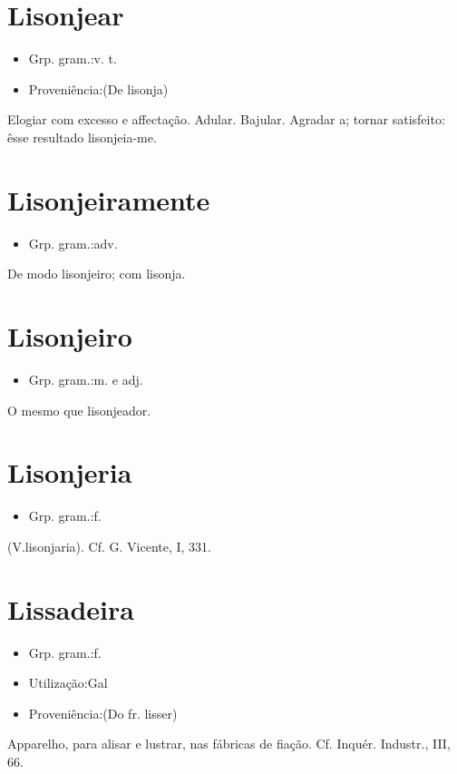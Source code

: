 \section{Lisonjear}
\begin{itemize}
\item {Grp. gram.:v. t.}
\end{itemize}
\begin{itemize}
\item {Proveniência:(De \textunderscore lisonja\textunderscore )}
\end{itemize}
Elogiar com excesso e affectação.
Adular.
Bajular.
Agradar a; tornar satisfeito: \textunderscore êsse resultado lisonjeia-me\textunderscore .
\section{Lisonjeiramente}
\begin{itemize}
\item {Grp. gram.:adv.}
\end{itemize}
De modo lisonjeiro; com lisonja.
\section{Lisonjeiro}
\begin{itemize}
\item {Grp. gram.:m.  e  adj.}
\end{itemize}
O mesmo que \textunderscore lisonjeador\textunderscore .
\section{Lisonjeria}
\begin{itemize}
\item {Grp. gram.:f.}
\end{itemize}
(V.lisonjaria). Cf. G. Vicente, I, 331.
\section{Lissadeira}
\begin{itemize}
\item {Grp. gram.:f.}
\end{itemize}
\begin{itemize}
\item {Utilização:Gal}
\end{itemize}
\begin{itemize}
\item {Proveniência:(Do fr. \textunderscore lisser\textunderscore )}
\end{itemize}
Apparelho, para alisar e lustrar, nas fábricas de fiação. Cf. \textunderscore Inquér. Industr.\textunderscore , III, 66.
